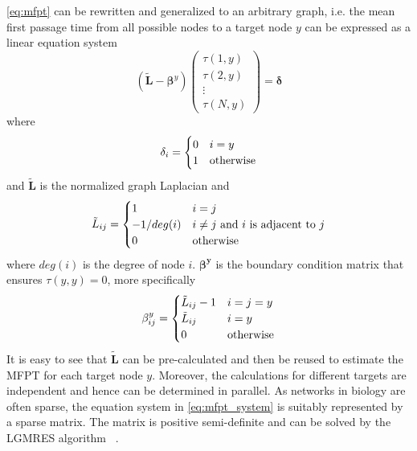 \ref{eq:mfpt} can be rewritten and generalized to an arbitrary graph, i.e.
the mean first passage time from all possible nodes to a target node $y$
can be expressed as a linear equation system
\begin{equation}
(\tilde{\mathbf{L}}-\boldsymbol{\beta}^y) 
\begin{pmatrix}
\tau(1,y)\\
\tau(2,y)\\
\vdots\\
\tau(N,y)
\end{pmatrix}
= \boldsymbol{\delta}
\label{eq:mfpt_system}
\end{equation}
where 
\begin{equation}
\delta_i=
\begin{cases}
0 & i=y\\
1 & \textnormal{otherwise}
\end{cases}
\end{equation}
and $\tilde{\mathbf{L}}$ is the normalized graph Laplacian and
\begin{equation}
\tilde{L}_{ij}=
\begin{cases}
1 & i=j\\
-1/deg(i) & i \neq j \ \textnormal{and}\ i \ \textnormal{is adjacent to}\ j \\
0 & \textnormal{otherwise}
\end{cases}
\end{equation}
where $deg(i)$ is the degree of node $i$. $\boldsymbol{\beta^y}$ 
is the boundary condition
matrix that ensures $\tau(y,y)=0$, more specifically
\begin{equation}
\beta^y_{ij}=
\begin{cases}
\tilde{L}_{ij}-1 & i=j=y\\
\tilde{L}_{ij} & i=y\\
0 & \textnormal{otherwise}
\end{cases}
\end{equation}
It is easy to see that $\tilde{\mathbf{L}}$ can be pre-calculated and then be 
reused to estimate the
MFPT for each target node $y$. Moreover, the calculations
for different targets are independent and hence can be
determined in parallel. As networks in biology are often
sparse, the equation system in \ref{eq:mfpt_system}
is suitably represented by a sparse matrix. The matrix
is positive semi-definite and can be solved by the LGMRES algorithm~%
\citep{Baker2005}.

